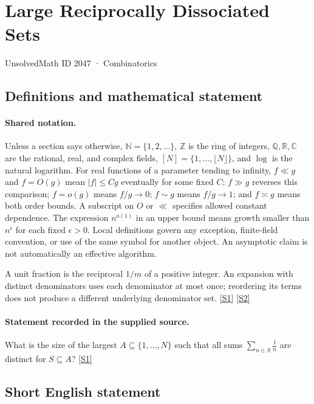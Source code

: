\documentclass[11pt,a4paper]{article}
\newcommand{\N}{\mathbb{N}}
\newcommand{\Z}{\mathbb{Z}}
\newcommand{\Q}{\mathbb{Q}}
\newcommand{\R}{\mathbb{R}}
\newcommand{\C}{\mathbb{C}}
\newcommand{\sref}[2]{\hyperlink{source:#1:#2}{[S#2]}}
\begin{document}

\setcounter{section}{2046}

\section{Large Reciprocally Dissociated Sets}\label{2047}

{\small\sffamily UnsolvedMath ID 2047 · Combinatorics}

\subsection{Definitions and mathematical statement}

\paragraph{Shared notation.}Unless a section says otherwise, $\N=\{1,2,\ldots\}$,
$\Z$ is the ring of integers, $\Q,\R,\C$ are the rational, real, and complex
fields, $[N]=\{1,\ldots,\lfloor N\rfloor\}$, and $\log$ is the natural
logarithm. For real functions of a parameter tending to infinity,
$f\ll g$ and $f=O(g)$ mean $|f|\leq Cg$ eventually for some fixed $C$;
$f\gg g$ reverses this comparison; $f=o(g)$ means $f/g\to0$;
$f\sim g$ means $f/g\to1$; and $f\asymp g$ means both order bounds.
A subscript on $O$ or $\ll$ specifies allowed constant dependence.
The expression $n^{o(1)}$ in an upper bound means growth smaller than
$n^\epsilon$ for each fixed $\epsilon>0$. Local definitions govern any
exception, finite-field convention, or use of the same symbol for another
object. An asymptotic claim is not automatically an effective algorithm.



A unit fraction is the reciprocal $1/m$ of a positive integer. An expansion with distinct denominators uses each denominator at most once; reordering its terms does not produce a different underlying denominator set. \sref{2047}{1} \sref{2047}{2}

\paragraph{Statement recorded in the supplied source.}
What is the size of the largest $A\subseteq \{1,\ldots,N\}$ such that all sums $\sum_{n\in S}\frac{1}{n}$ are distinct for $S\subseteq A$? \sref{2047}{1}

\subsection{Short English statement}
\end{document}
